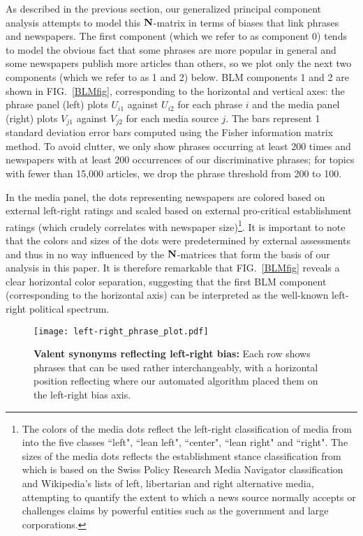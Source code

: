 \documentclass[10pt,letterpaper]{article}
\def\N{{\bf N}}
\def\fig#1{FIG.~\ref{#1}}
\begin{document}
As described in the previous section, our generalized principal component analysis 
attempts to model this $\N$-matrix in terms of biases that link phrases and newspapers.
The first component (which we refer to as component 0) tends to model the obvious fact that some phrases are more popular in general and some newspapers publish more articles than others, so we plot only the next two components (which we refer to as 1 and 2) below.
BLM components 1 and 2 are shown in \fig{BLMfig}, corresponding to the horizontal and vertical axes: the phrase panel (left) plots $U_{i1}$ against $U_{i2}$ for each phrase $i$
and the media panel (right) plots $V_{j1}$ against $V_{j2}$ for each media source $j$. The bars represent 1 standard deviation error bars computed using the Fisher information matrix method. To avoid clutter, we only show phrases occurring at least 200 times and newspapers with at least 200 occurrences of our discriminative phrases; for topics with fewer than 15,000 articles, we drop the phrase threshold from 200 to 100.

In the media panel, the dots representing newspapers are colored based on external left-right ratings and scaled based on external pro-critical establishment ratings (which crudely correlates with newspaper size)\footnote{The colors of the media dots reflect the left-right classification of media from \cite{noauthor_allsides_nodate} into the five classes ``left", ``lean left", ``center", ``lean right" and ``right". The  sizes of the media dots reflects the establishment stance classification
from \cite{noauthor_improve_nodate} which is based on the Swiss Policy Research Media Navigator classification \cite{noauthor_media_nodate} and Wikipedia's lists 
of left, libertarian and right alternative media, attempting to quantify the extent to which
a news source normally accepts or challenges claims by powerful entities such as the government and large corporations.}.
It is important to note that the colors and sizes of the dots were predetermined by external assessments and thus in no way influenced by the $\N$-matrices that form the basis of our analysis in this paper. 
It is therefore remarkable that \fig{BLMfig} reveals a clear horizontal color separation,
suggesting that the first BLM component (corresponding to the horizontal axis) 
can be interpreted as the well-known left-right political spectrum. 


\begin{figure}[tb]
\caption{{\bf Valent synonyms reflecting left-right bias:}
Each row shows phrases that can be used rather interchangeably, 
with a horizontal position reflecting
where our automated algorithm placed them on the left-right bias axis.}
\hglue-1.6cm 
\texttt{[image: left-right\_phrase\_plot.pdf]}
\label{phrase_plots}
\end{figure}
\end{document}
